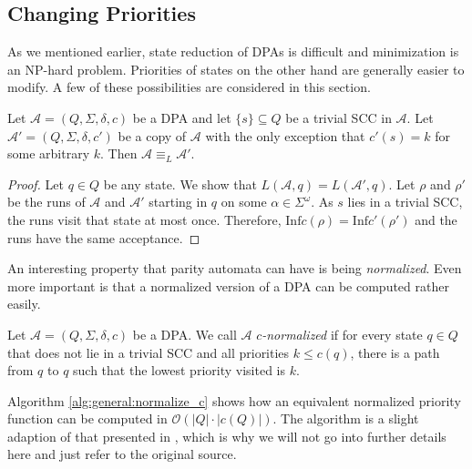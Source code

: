 \subsection{Changing Priorities}
As we mentioned earlier, state reduction of DPAs is difficult and minimization is an NP-hard problem. Priorities of states on the other hand are generally easier to modify. A few of these possibilities are considered in this section.

\begin{lem}
\label{lem:general:trivial_scc_dont_matter}
	Let $\mathcal{A} = (Q, \Sigma, \delta, c)$ be a DPA and let $\{s\} \subseteq Q$ be a trivial SCC in $\mathcal{A}$. Let $\mathcal{A}' = (Q, \Sigma, \delta, c')$ be a copy of $\mathcal{A}$ with the only exception that $c'(s) = k$ for some arbitrary $k$. Then $\mathcal{A} \equiv_L \mathcal{A}'$.
\end{lem}

\begin{proof}
	Let $q \in Q$ be any state. We show that $L(\mathcal{A}, q) = L(\mathcal{A}', q)$. Let $\rho$ and $\rho'$ be the runs of $\mathcal{A}$ and $\mathcal{A}'$ starting in $q$ on some $\alpha \in \Sigma^\omega$. As $s$ lies in a trivial SCC, the runs visit that state at most once. Therefore, $\text{Inf} c(\rho) = \text{Inf} c'(\rho')$ and the runs have the same acceptance.
\end{proof}

\vspace{10pt}

An interesting property that parity automata can have is being \emph{normalized}. Even more important is that a normalized version of a DPA can be computed rather easily.

\begin{defn}
	Let $\mathcal{A} = (Q, \Sigma, \delta, c)$ be a DPA. We call $\mathcal{A}$ \emph{$c$-normalized} if for every state $q \in Q$ that does not lie in a trivial SCC and all priorities $k \leq c(q)$, there is a path from $q$ to $q$ such that the lowest priority visited is $k$.
\end{defn}


Algorithm \ref{alg:general:normalize_c} shows how an equivalent normalized priority function can be computed in $\mathcal{O}(|Q| \cdot |c(Q)|)$. The algorithm is a slight adaption of that presented in \cite{CartonMaceiras99}, which is why we will not go into further details here and just refer to the original source.

